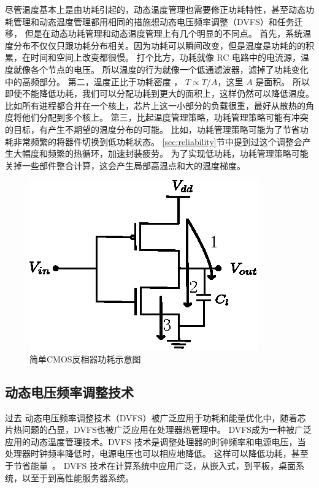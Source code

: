 尽管温度基本上是由功耗引起的，动态温度管理也需要修正功耗特性，甚至动态功耗管理和动态温度管理都用相同的措施想动态电压频率调整（DVFS）和任务迁移，
但是在动态功耗管理和动态温度管理上有几个明显的不同点。
首先，系统温度分布不仅仅只跟功耗分布相关。因为功耗可以瞬间改变，但是温度是功耗的的积累，在时间和空间上改变都很慢。
打个比方，功耗就像 RC 电路中的电流源，温度就像各个节点的电压。
所以温度的行为就像一个低通滤波器，滤掉了功耗变化中的高频部分。
第二，温度正比于功耗密度 ， $ T \propto T/A$，这里 $A$ 是面积。
所以即使不能降低功耗，我们可以分配功耗到更大的面积上，这样仍然可以降低温度。
比如所有进程都合并在一个核上，芯片上这一小部分的负载很重，最好从散热的角度将他们分配到多个核上。
第三，比起温度管理策略，功耗管理策略可能有冲突的目标，有产生不期望的温度分布的可能。
比如，功耗管理策略可能为了节省功耗非常频繁的将器件切换到低功耗状态。
\ref{sec:reliability}节中提到过这个调整会产生大幅度和频繁的热循环，加速封装疲劳。
为了实现低功耗，功耗管理策略可能关掉一些部件整合计算，这会产生局部高温点和大的温度梯度。
\\
\begin{figure}
  \centering
    \includegraphics[width=0.7\columnwidth]{fig/inverter}
  \caption{简单CMOS反相器功耗示意图}\label{fig:inverter}
\end{figure}

\subsection{动态电压频率调整技术}\label{sec:DVFS}

过去 动态电压频率调整技术（DVFS）被广泛应用于功耗和能量优化中，随着芯片热问题的凸显，DVFS也被广泛应用在处理器热管理中。
DVFS成为一种被广泛应用的动态温度管理技术。DVFS 技术是调整处理器的时钟频率和电源电压，当处理器时钟频率降低时，电源电压也可以相应地降低。
这样可以降低功耗，甚至于节省能量~\cite{le2010dynamic}。
DVFS 技术在计算系统中应用广泛，从嵌入式，到平板，桌面系统，以至于到高性能服务器系统。

